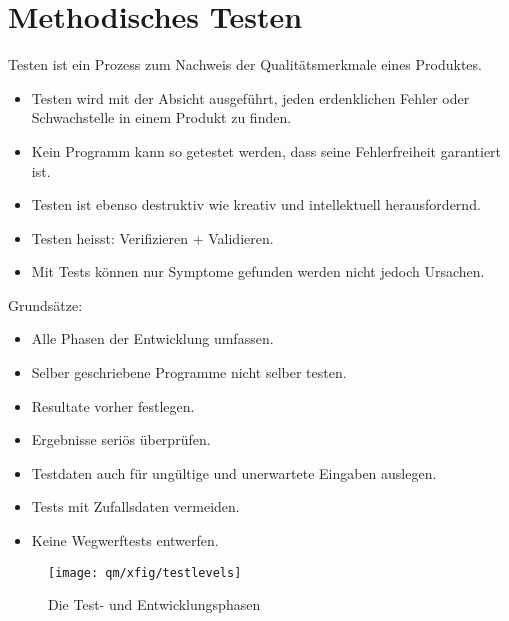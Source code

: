 \section{Methodisches Testen}
%
Testen ist ein Prozess zum Nachweis der Qualitätsmerkmale eines
Produktes.
\begin{itemize}
\item Testen wird mit der Absicht ausgeführt,
jeden erdenklichen Fehler oder Schwachstelle in einem Produkt zu finden.
\item Kein Programm kann so getestet werden, dass seine Fehlerfreiheit
garantiert ist.
\item Testen ist ebenso destruktiv wie
  kreativ und intellektuell herausfordernd.
\item Testen heisst: Verifizieren + Validieren.
\item Mit Tests können nur Symptome gefunden werden nicht jedoch Ursachen.
\end{itemize}
\ifslides
\newpage
\fi
Grunds\"atze:
\begin{itemize}
\item Alle Phasen der Entwicklung umfassen.
\item Selber geschriebene Programme nicht selber testen.
\item Resultate vorher festlegen.
\item Ergebnisse seri\"os \"uberpr\"ufen.
\item Testdaten auch f\"ur ung\"ultige und unerwartete Eingaben auslegen.
\item Tests mit Zufallsdaten vermeiden. %
\item Keine Wegwerftests entwerfen.
\end{itemize}
\newslide
\begin{figure}[H]
\begin{center}
\texttt{[image: qm/xfig/testlevels]}
\caption{Die Test- und Entwicklungsphasen}
\end{center}
\end{figure}
\newslide
